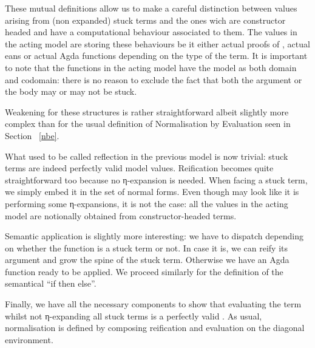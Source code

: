 These mutual definitions allow us to make a careful distinction between values
arising from (non expanded) stuck terms and the ones wich are constructor headed
and have a computational behaviour associated to them. The values in the acting
model are storing these behaviours be it either actual proofs of , actual
eans or actual Agda functions depending on the type of the term. It is
important to note that the functions in the acting model have the model as both
domain and codomain: there is no reason to exclude the fact that both the argument
or the body may or may not be stuck.

Weakening for these structures is rather straightforward
albeit slightly more complex than for the usual definition of Normalisation
by Evaluation seen in Section ~\ref{nbe}.


What used to be called reflection in the previous model is now trivial:
stuck terms are indeed perfectly valid model values. Reification becomes
quite straightforward too because no η-expansion is needed. When facing
a stuck term, we simply embed it in the set of normal forms. Even though
 may look like it is performing some η-expansions, it
is not the case: all the values in the acting model are notionally obtained
from constructor-headed terms.


Semantic application is slightly more interesting: we have to dispatch
depending on whether the function is a stuck term or not. In case it is,
we can reify its argument and grow the spine of the stuck term. Otherwise
we have an Agda function ready to be applied. We proceed similarly for
the definition of the semantical ``if then else''.


Finally, we have all the necessary components to show that evaluating
the term whilst not η-expanding all stuck terms is a perfectly valid
. As usual, normalisation is defined by composing
reification and evaluation on the diagonal environment.


